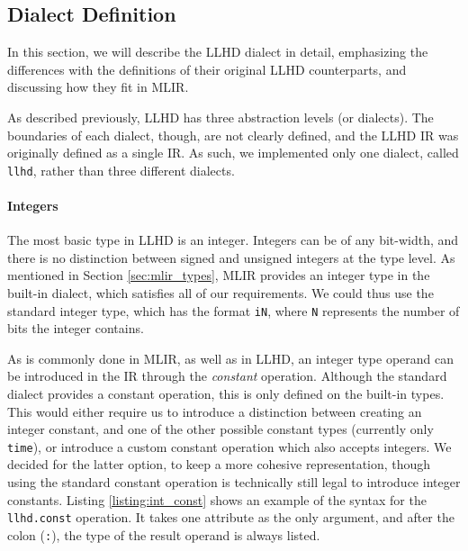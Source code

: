 

\subsection{Dialect Definition}
In this section, we will describe the LLHD dialect in detail, emphasizing the differences with the definitions of their original LLHD counterparts, and discussing how they fit in MLIR.

As described previously, LLHD has three abstraction levels (or dialects). The boundaries of each dialect, though, are not clearly defined, and the LLHD IR was originally defined as a single IR. As such, we implemented only one dialect, called \texttt{llhd}, rather than three different dialects.

\paragraph{Integers}
The most basic type in LLHD is an integer. Integers can be of any bit-width, and there is no distinction between signed and unsigned integers at the type level. As mentioned in Section \ref{sec:mlir_types}, MLIR provides an integer type in the built-in dialect, which satisfies all of our requirements. We could thus use the standard integer type, which has the format \texttt{iN}, where \texttt{N} represents the number of bits the integer contains.

As is commonly done in MLIR, as well as in LLHD, an integer type operand can be introduced in the IR through the \textit{constant} operation. Although the standard dialect provides a constant operation, this is only defined on the built-in types. This would either require us to introduce a distinction between creating an integer constant, and one of the other possible constant types (currently only \texttt{time}), or introduce a custom constant operation which also accepts integers. We decided for the latter option, to keep a more cohesive representation, though using the standard constant operation is technically still legal to introduce integer constants. Listing \ref{listing:int_const} shows an example of the syntax for the \texttt{llhd.const} operation. It takes one attribute as the only argument, and after the colon (\texttt{:}), the type of the result operand is always listed.

